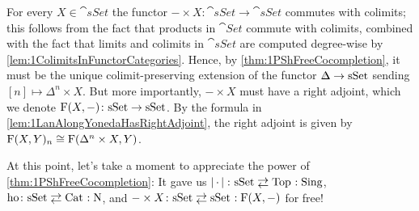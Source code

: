 \begin{numpar}\label{par:FInternalHom}
	For every $X\in\cat{sSet}$ the functor $-\times X\colon\cat{sSet}\rightarrow\cat{sSet}$ commutes with colimits; this follows from the fact that products in $\cat{Set}$ commute with colimits, combined with the fact that limits and colimits in $\cat{sSet}$ are computed degree-wise by \cref{lem:1ColimitsInFunctorCategories}. Hence, by \cref{thm:1PShFreeCocompletion}, it must be the unique colimit-preserving extension of the functor $\IDelta\rightarrow\cat{sSet}$ sending $[n]\mapsto \Delta^n\times X$. But more importantly, $-\times X$ must have a right adjoint, which we denote $\operatorname{F}(X,-)\colon \mathrm{sSet}\rightarrow\mathrm{sSet}$. By the formula in \cref{lem:1LanAlongYonedaHasRightAdjoint}, the right adjoint is given by $\operatorname{F}(X,Y)_n\cong \operatorname{F}(\Delta^n\times X,Y)$.
\end{numpar}

At this point, let's take a moment to appreciate the power of \cref{thm:1PShFreeCocompletion}: It gave us $\left|\,\cdot\,\right|\colon \cat{sSet}\shortdoublelrmorphism\cat{Top}\noloc \Sing$, $\operatorname{ho}\colon \cat{sSet}\shortdoublelrmorphism\cat{Cat}\noloc \N$, and $-\times X\colon \cat{sSet}\shortdoublelrmorphism \cat{sSet}\noloc \F(X,-)$ for free!

